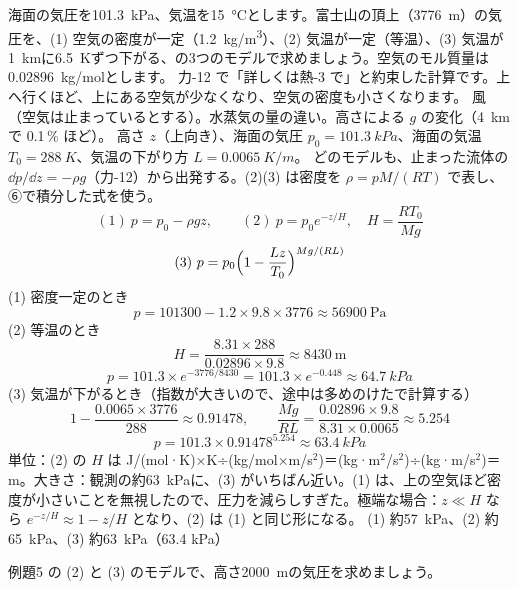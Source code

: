 \begin{phreidai}[富士山の頂上の気圧]
\label{ph:熱-3:ex5}海面の気圧を\qty{101.3}{kPa}、気温を\qty{15}{\celsius}とします。富士山の頂上（\qty{3776}{m}）の気圧を、(1) 空気の密度が一定（\qty{1.2}{kg/m^3}）、(2) 気温が一定（等温）、(3) 気温が\qty{1}{km}に\qty{6.5}{K}ずつ下がる、の3つのモデルで求めましょう。空気のモル質量は\qty{0.02896}{kg/mol}とします。
\phbamen
力-12 で「詳しくは熱-3 で」と約束した計算です。上へ行くほど、上にある空気が少なくなり、空気の密度も小さくなります。
\phmushi
風（空気は止まっているとする）。水蒸気の量の違い。高さによる $g$ の変化（\qty{4}{km}で 0.1\,\% ほど）。
\phzu
高さ $z$（上向き）、海面の気圧 $p_0=\qty{101.3}{kPa}$、海面の気温 $T_0=\qty{288}{K}$、気温の下がり方 $L=\qty{0.0065}{K/m}$。
\phriyu
どのモデルも、止まった流体の $\dd p/\dd z=-\rho g$（力-12）から出発する。(2)(3) は密度を $\rho=pM/(RT)$ で表し、⑥で積分した式を使う。
\phtateru
\[ (1)\ p=p_0-\rho gz,\qquad (2)\ p=p_0e^{-z/H},\quad H=\frac{RT_0}{Mg} \]
\[ (3)\ p=p_0\Bigl(1-\frac{Lz}{T_0}\Bigr)^{Mg/(RL)} \]
\phtoku
(1) 密度一定のとき
\[ p=\num{101300}-1.2\times9.8\times3776\approx\num{56900}\ \mathrm{Pa} \]
(2) 等温のとき
\[ H=\frac{8.31\times288}{0.02896\times9.8}\approx\num{8430}\ \mathrm{m} \]
\[ p=101.3\times e^{-3776/8430}=101.3\times e^{-0.448}\approx\qty{64.7}{kPa} \]
(3) 気温が下がるとき（指数が大きいので、途中は多めのけたで計算する）
\[ 1-\frac{0.0065\times3776}{288}\approx0.91478,\qquad \frac{Mg}{RL}=\frac{0.02896\times9.8}{8.31\times0.0065}\approx5.254 \]
\[ p=101.3\times0.91478^{5.254}\approx\qty{63.4}{kPa} \]
\phtashikame
単位：(2) の $H$ は J/(mol·K)×K÷(kg/mol×m/s$^2$)＝(kg·m$^2$/s$^2$)÷(kg·m/s$^2$)＝m。大きさ：観測の約\qty{63}{kPa}に、(3) がいちばん近い。(1) は、上の空気ほど密度が小さいことを無視したので、圧力を減らしすぎた。極端な場合：$z\ll H$ なら $e^{-z/H}\approx1-z/H$ となり、(2) は (1) と同じ形になる。
\kotae (1) 約\qty{57}{kPa}、(2) 約\qty{65}{kPa}、(3) 約\qty{63}{kPa}（63.4 kPa）
\end{phreidai}
\begin{jibun}
例題5 の (2) と (3) のモデルで、高さ\qty{2000}{m}の気圧を求めましょう。
\end{jibun}

